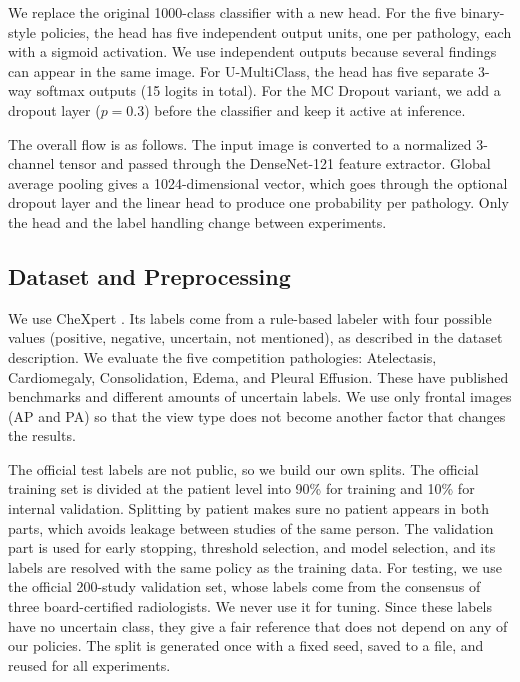 \documentclass[conference]{IEEEtran}
\begin{document}
We replace the original 1000-class classifier with a new head. For the five binary-style policies, the head has five independent output units, one per pathology, each with a sigmoid activation. We use independent outputs because several findings can appear in the same image. For U-MultiClass, the head has five separate 3-way softmax outputs (15 logits in total). For the MC Dropout variant, we add a dropout layer ($p = 0.3$) before the classifier and keep it active at inference.

The overall flow is as follows. The input image is converted to a normalized 3-channel tensor and passed through the DenseNet-121 feature extractor. Global average pooling gives a 1024-dimensional vector, which goes through the optional dropout layer and the linear head to produce one probability per pathology. Only the head and the label handling change between experiments.

\subsection{Dataset and Preprocessing}

We use CheXpert \cite{ref1}. Its labels come from a rule-based labeler with four possible values (positive, negative, uncertain, not mentioned), as described in the dataset description. We evaluate the five competition pathologies: Atelectasis, Cardiomegaly, Consolidation, Edema, and Pleural Effusion. These have published benchmarks \cite{ref1,ref5} and different amounts of uncertain labels. We use only frontal images (AP and PA) so that the view type does not become another factor that changes the results.

The official test labels are not public, so we build our own splits. The official training set is divided at the patient level into 90\% for training and 10\% for internal validation. Splitting by patient makes sure no patient appears in both parts, which avoids leakage between studies of the same person. The validation part is used for early stopping, threshold selection, and model selection, and its labels are resolved with the same policy as the training data. For testing, we use the official 200-study validation set, whose labels come from the consensus of three board-certified radiologists. We never use it for tuning. Since these labels have no uncertain class, they give a fair reference that does not depend on any of our policies. The split is generated once with a fixed seed, saved to a file, and reused for all experiments.
\end{document}
